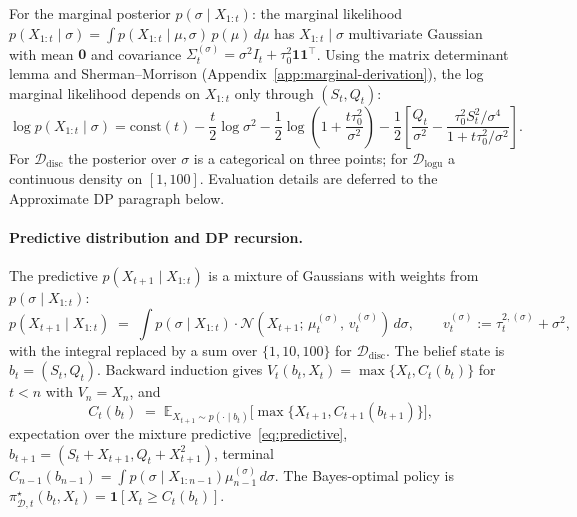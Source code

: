 \documentclass[11pt]{article}
\begin{document}
For the marginal posterior $p(\sigma \mid X_{1:t})$: the marginal likelihood $p(X_{1:t} \mid \sigma) = \int p(X_{1:t} \mid \mu, \sigma)\, p(\mu)\, d\mu$ has $X_{1:t} \mid \sigma$ multivariate Gaussian with mean $\mathbf{0}$ and covariance $\Sigma_t^{(\sigma)} = \sigma^2 I_t + \tau_0^2 \mathbf{1}\mathbf{1}^\top$. Using the matrix determinant lemma and Sherman--Morrison (Appendix~\ref{app:marginal-derivation}), the log marginal likelihood depends on $X_{1:t}$ only through $(S_t, Q_t)$:
\begin{equation}
\label{eq:marginal-loglik}
\log p(X_{1:t} \mid \sigma) = \mathrm{const}(t) - \frac{t}{2}\log\sigma^2 - \frac{1}{2}\log\!\left(1 + \frac{t\tau_0^2}{\sigma^2}\right) - \frac{1}{2}\!\left[\frac{Q_t}{\sigma^2} - \frac{\tau_0^2 S_t^2/\sigma^4}{1 + t\tau_0^2/\sigma^2}\right].
\end{equation}
For $\mathcal{D}_{\mathrm{disc}}$ the posterior over $\sigma$ is a categorical on three points; for $\mathcal{D}_{\mathrm{logu}}$ a continuous density on $[1, 100]$. Evaluation details are deferred to the Approximate DP paragraph below.

\paragraph{Predictive distribution and DP recursion.} The predictive $p(X_{t+1} \mid X_{1:t})$ is a mixture of Gaussians with weights from $p(\sigma \mid X_{1:t})$:
\begin{equation}
\label{eq:predictive}
p(X_{t+1} \mid X_{1:t}) \;=\; \int p(\sigma \mid X_{1:t}) \cdot \mathcal{N}\!\left(X_{t+1};\, \mu_t^{(\sigma)},\, v_t^{(\sigma)}\right)\, d\sigma,
\qquad v_t^{(\sigma)} := \tau_t^{2,(\sigma)} + \sigma^2,
\end{equation}
with the integral replaced by a sum over $\{1, 10, 100\}$ for $\mathcal{D}_{\mathrm{disc}}$. The belief state is $b_t = (S_t, Q_t)$. Backward induction gives $V_t(b_t, X_t) = \max\{X_t, C_t(b_t)\}$ for $t < n$ with $V_n = X_n$, and
\begin{equation}
\label{eq:Crec-random}
C_t(b_t) \;=\; \mathbb{E}_{X_{t+1} \sim p(\cdot \mid b_t)}\!\big[\max\{X_{t+1}, C_{t+1}(b_{t+1})\}\big],
\end{equation}
expectation over the mixture predictive~\eqref{eq:predictive}, $b_{t+1} = (S_t + X_{t+1}, Q_t + X_{t+1}^2)$, terminal $C_{n-1}(b_{n-1}) = \int p(\sigma \mid X_{1:n-1}) \mu_{n-1}^{(\sigma)}\, d\sigma$. The Bayes-optimal policy is $\pi^\star_{\mathcal{D}, t}(b_t, X_t) = \mathbf{1}[X_t \ge C_t(b_t)]$.
\end{document}
